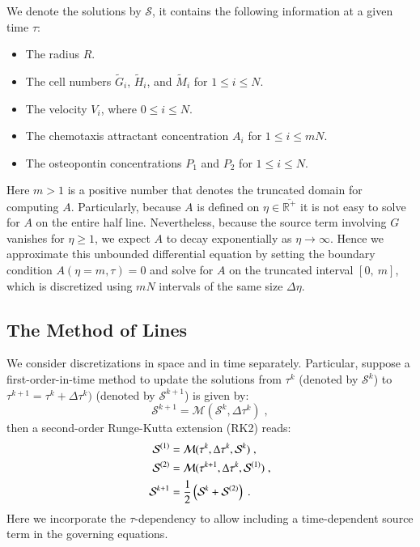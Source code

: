 \documentclass{amsart}
\theoremstyle{definition}
\theoremstyle{remark}
\numberwithin{equation}{section}
\numberwithin{figure}{section}
\begin{document}
We denote the solutions by $\mathcal{S}$, it contains the following information at a given time $\tau$:
\begin{itemize}
\item The radius $R$.
\item The cell numbers $\tilde{G}_i$, $\tilde{H}_i$, and $\tilde{M}_i$ for $1\le i\le N$.
\item The velocity $V_i$, where $0\le i\le N$.
\item The chemotaxis attractant concentration $A_i$ for $1\le i\le mN$.
\item The osteopontin concentrations $P_1$ and $P_2$ for $1\le i \le N$.
\end{itemize}
Here $m>1$ is a positive number that denotes the truncated domain for computing $A$.
Particularly, because $A$ is defined on $\eta\in\overline{\mathbb{R}^+}$ it is not easy to solve for $A$ on the entire half line.
Nevertheless, because the source term involving $G$ vanishes for $\eta\ge1$, we expect $A$ to decay exponentially as $\eta\to\infty$.
Hence we approximate this unbounded differential equation by setting the boundary condition $A(\eta=m,\tau)=0$ and solve for $A$ on the truncated interval $[0,\ m]$, which is discretized using $mN$ intervals of the same size $\Delta\eta$.

\subsection{The Method of Lines}
We consider discretizations in space and in time separately.
Particular, suppose a first-order-in-time method to update the solutions from $\tau^k$ (denoted by $\mathcal{S}^k$) to $\tau^{k+1}=\tau^k+\Delta\tau^k)$ (denoted by $\mathcal{S}^{k+1}$) is given by: 
\begin{displaymath}
\mathcal{S}^{k+1} = \mathcal{M}(\mathcal{S}^k,\Delta\tau^k)\;,
\end{displaymath}
then a second-order Runge-Kutta extension (RK2) reads:
\begin{align}
\notag
\mathcal{S}^{(1)} &= \mathcal{M}(\tau^k, \Delta \tau^k,\mathcal{S}^k)\;, \\ 
\label{eq:num_rk2}
\mathcal{S}^{(2)} &= \mathcal{M}(\tau^{k+1}, \Delta \tau^k,\mathcal{S}^{(1)})\;, \\
\notag
\mathcal{S}^{k+1} &= \frac{1}{2}\left(\mathcal{S}^k + \mathcal{S}^{(2)}\right)\;.
\end{align}
Here we incorporate the $\tau$-dependency to allow including a time-dependent source term in the governing equations.
\end{document}
